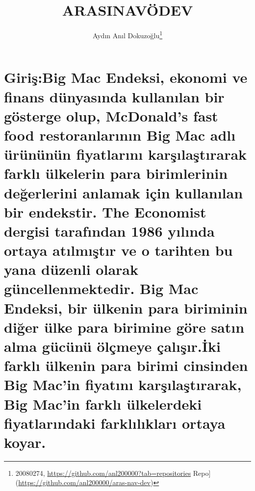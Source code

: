 \documentclass[
  12pt,
]{article}
\title{ARASINAVÖDEV}
\author{Aydın Anıl Dokuzoğlu\footnote{20080274, \url{https://github.com/anl200000?tab=repositories} Repo{]}(\url{https://github.com/anl200000/aras-nav-dev})}}
\date{}
\begin{document}
\maketitle

\hypertarget{giriux15fbig-mac-endeksi-ekonomi-ve-finans-duxfcnyasux131nda-kullanux131lan-bir-guxf6sterge-olup-mcdonalds-fast-food-restoranlarux131nux131n-big-mac-adlux131-uxfcruxfcnuxfcnuxfcn-fiyatlarux131nux131-karux15fux131laux15ftux131rarak-farklux131-uxfclkelerin-para-birimlerinin-deux11ferlerini-anlamak-iuxe7in-kullanux131lan-bir-endekstir.-the-economist-dergisi-tarafux131ndan-1986-yux131lux131nda-ortaya-atux131lmux131ux15ftux131r-ve-o-tarihten-bu-yana-duxfczenli-olarak-guxfcncellenmektedir.-big-mac-endeksi-bir-uxfclkenin-para-biriminin-diux11fer-uxfclke-para-birimine-guxf6re-satux131n-alma-guxfccuxfcnuxfc-uxf6luxe7meye-uxe7alux131ux15fux131r.iki-farklux131-uxfclkenin-para-birimi-cinsinden-big-macin-fiyatux131nux131-karux15fux131laux15ftux131rarak-big-macin-farklux131-uxfclkelerdeki-fiyatlarux131ndaki-farklux131lux131klarux131-ortaya-koyar.}{%
\section{Giriş:Big Mac Endeksi, ekonomi ve finans dünyasında kullanılan bir gösterge olup, McDonald's fast food restoranlarının Big Mac adlı ürününün fiyatlarını karşılaştırarak farklı ülkelerin para birimlerinin değerlerini anlamak için kullanılan bir endekstir. The Economist dergisi tarafından 1986 yılında ortaya atılmıştır ve o tarihten bu yana düzenli olarak güncellenmektedir. Big Mac Endeksi, bir ülkenin para biriminin diğer ülke para birimine göre satın alma gücünü ölçmeye çalışır.İki farklı ülkenin para birimi cinsinden Big Mac'in fiyatını karşılaştırarak, Big Mac'in farklı ülkelerdeki fiyatlarındaki farklılıkları ortaya koyar.}\label{giriux15fbig-mac-endeksi-ekonomi-ve-finans-duxfcnyasux131nda-kullanux131lan-bir-guxf6sterge-olup-mcdonalds-fast-food-restoranlarux131nux131n-big-mac-adlux131-uxfcruxfcnuxfcnuxfcn-fiyatlarux131nux131-karux15fux131laux15ftux131rarak-farklux131-uxfclkelerin-para-birimlerinin-deux11ferlerini-anlamak-iuxe7in-kullanux131lan-bir-endekstir.-the-economist-dergisi-tarafux131ndan-1986-yux131lux131nda-ortaya-atux131lmux131ux15ftux131r-ve-o-tarihten-bu-yana-duxfczenli-olarak-guxfcncellenmektedir.-big-mac-endeksi-bir-uxfclkenin-para-biriminin-diux11fer-uxfclke-para-birimine-guxf6re-satux131n-alma-guxfccuxfcnuxfc-uxf6luxe7meye-uxe7alux131ux15fux131r.iki-farklux131-uxfclkenin-para-birimi-cinsinden-big-macin-fiyatux131nux131-karux15fux131laux15ftux131rarak-big-macin-farklux131-uxfclkelerdeki-fiyatlarux131ndaki-farklux131lux131klarux131-ortaya-koyar.}}
\end{document}
